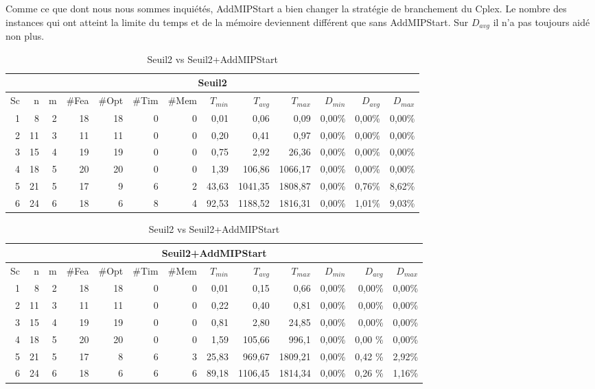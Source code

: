 \documentclass[twoside,fleqn]{EPURapport}
\begin{document}
Comme ce que dont nous nous sommes inquiétés, AddMIPStart a bien changer la stratégie de branchement du Cplex. Le nombre des instances qui ont atteint la limite du temps et de la mémoire deviennent différent que sans AddMIPStart. Sur $D_{avg}$ il n'a pas toujours aidé non plus.
\begin{table}[h]
    \centering
    \begin{tabular}{|r|r|r|r|r|r|r|r|r|r|r|r|r|}
    	\hline
    	\multicolumn{13}{|c|}{Seuil2}\\ \hline
Sc &	n	&m	&\#Fea	&\#Opt	&\#Tim &\#Mem	&$T_{min}$ & $T_{avg}$	& $T_{max}$ & $D_{min}$ & $D_{avg}$	& $D_{max}$ \\ \hline
1&	8 &	2&	18&	18&	0&	0&	0,01&	0,06&	0,09	&0,00\%&	0,00\%&	0,00\%    \\ \hline
2&	11&	3&	11&	11&	0&	0&	0,20&	0,41&	0,97	&0,00\%&	0,00\%&	0,00\%     \\ \hline
3&	15&	4&	19&	19&	0&	0&	0,75&	2,92&	26,36	&0,00\%&	0,00\%&	0,00\%  \\ \hline
4 &	18	&5	&20	&20	&0	&0	&1,39	&106,86	    &1066,17	&0,00\%&	0,00\%&	0,00\% \\ \hline
5 &	21	&5	&17	&9	&6	&2	&43,63	&1041,35	&1808,87	&0,00\%&	0,76\%&	8,62\% \\ \hline
6 &	24	&6	&18	&6	&8	&4	&92,53	&1188,52	&1816,31	&0,00\%&	1,01\%&	9,03\% \\ \hline
    \end{tabular}
\medskip \par
    \begin{tabular}{|r|r|r|r|r|r|r|r|r|r|r|r|r|}
    	\hline
    	\multicolumn{13}{|c|}{Seuil2+AddMIPStart}\\ \hline
Sc &	n	&m	&\#Fea	&\#Opt	&\#Tim &\#Mem	&$T_{min}$ & $T_{avg}$	& $T_{max}$ & $D_{min}$ & $D_{avg}$	& $D_{max}$ \\ \hline
1&	8 &	2&	18&	18&	0&	0&	0,01&	0,15&	0,66	&0,00\%&	0,00\%&	0,00\%    \\ \hline
2&	11&	3&	11&	11&	0&	0&	0,22&	0,40&	0,81	&0,00\%&	0,00\%&	0,00\%     \\ \hline
3&	15&	4&	19&	19&	0&	0&	0,81&	2,80&	24,85	&0,00\%&	0,00\%&	0,00\%  \\ \hline
4 &	18	&5	&20	&20	&0	&0	&1,59	&105,66	   & 996,1	&   0,00\%&	0,00	\%&0,00\% \\ \hline
5 &	21	&5	&17	&8	&6	&3	&25,83	&969,67	   & 1809,21&	0,00\%&	0,42	\%&2,92\% \\ \hline
6 &	24	&6	&18	&6	&6	&6	&89,18	&1106,45	&1814,34&	0,00\%&	0,26	\%&1,16\% \\ \hline
    \end{tabular} 
    \caption{Seuil2 vs Seuil2+AddMIPStart}
    \label{tab_cut2_ams2_tab2}
\end{table}
\bigskip
\end{document}
